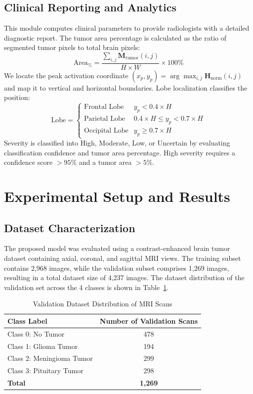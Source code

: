 \documentclass[journal,twoside]{IEEEtran}
\begin{document}
\subsection{Clinical Reporting and Analytics}
This module computes clinical parameters to provide radiologists with a detailed diagnostic report. The tumor area percentage is calculated as the ratio of segmented tumor pixels to total brain pixels:
\begin{equation}
\text{Area}_{\%} = \frac{\sum_{i,j} \mathbf{M}_{\text{tumor}}(i,j)}{H \times W} \times 100\%
\end{equation}
We locate the peak activation coordinate $(x_p, y_p) = \arg\max_{i,j} \mathbf{H}_{\text{norm}}(i,j)$ and map it to vertical and horizontal boundaries. Lobe localization classifies the position:
\begin{equation}
\text{Lobe} = \begin{cases} 
      \text{Frontal Lobe} & y_p < 0.4 \times H \\
      \text{Parietal Lobe} & 0.4 \times H \le y_p < 0.7 \times H \\
      \text{Occipital Lobe} & y_p \ge 0.7 \times H
   \end{cases}
\end{equation}
Severity is classified into High, Moderate, Low, or Uncertain by evaluating classification confidence and tumor area percentage. High severity requires a confidence score $> 95\%$ and a tumor area $> 5\%$.

\section{Experimental Setup and Results}
\subsection{Dataset Characterization}
The proposed model was evaluated using a contrast-enhanced brain tumor dataset containing axial, coronal, and sagittal MRI views. The training subset contains 2,968 images, while the validation subset comprises 1,269 images, resulting in a total dataset size of 4,237 images. The dataset distribution of the validation set across the 4 classes is shown in Table~\ref{tab:dataset}.

\begin{table}[h]
\centering
\caption{Validation Dataset Distribution of MRI Scans}
\label{tab:dataset}
\begin{tabular}{lc}
\toprule
\textbf{Class Label} & \textbf{Number of Validation Scans} \\
\midrule
Class 0: No Tumor & 478 \\
Class 1: Glioma Tumor & 194 \\
Class 2: Meningioma Tumor & 299 \\
Class 3: Pituitary Tumor & 298 \\
\midrule
\textbf{Total} & \textbf{1,269} \\
\bottomrule
\end{tabular}
\end{table}
\end{document}
